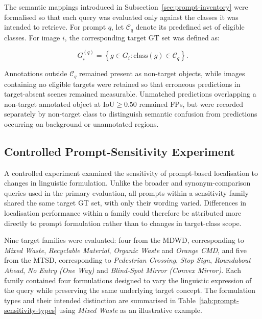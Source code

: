 The semantic mappings introduced in Subsection~\ref{sec:prompt-inventory} were formalised so that each query was evaluated only against the classes it was intended to retrieve. For prompt \(q\), let \(\mathcal{C}_q\) denote its predefined set of eligible classes. For image \(i\), the corresponding target \gls{GT} set was defined as:

\begin{equation}
G_i^{(q)} =
\left\{
g \in G_i :
\mathrm{class}(g) \in \mathcal{C}_q
\right\}.
\end{equation}

\noindent Annotations outside \(\mathcal{C}_q\) remained present as non-target objects, while images containing no eligible targets were retained so that erroneous predictions in target-absent scenes remained measurable. Unmatched predictions overlapping a non-target annotated object at \(\mathrm{IoU} \geq 0.50\) remained \glspl{FP}, but were recorded separately by non-target class to distinguish semantic confusion from predictions occurring on background or unannotated regions.

\subsection{Controlled Prompt-Sensitivity Experiment}
\label{sec:prompt-sensitivity}
A controlled experiment examined the sensitivity of prompt-based localisation to changes in linguistic formulation. Unlike the broader and synonym-comparison queries used in the primary evaluation, all prompts within a sensitivity family shared the same target \gls{GT} set, with only their wording varied. Differences in localisation performance within a family could therefore be attributed more directly to prompt formulation rather than to changes in target-class scope.

Nine target families were evaluated: four from the \gls{MDWD}, corresponding to \emph{Mixed Waste}, \emph{Recyclable Material}, \emph{Organic Waste} and \emph{Orange \gls{CMD}}, and five from the \gls{MTSD}, corresponding to \emph{Pedestrian Crossing}, \emph{Stop Sign}, \emph{Roundabout Ahead}, \emph{No Entry (One Way)} and \emph{Blind-Spot Mirror (Convex Mirror)}. Each family contained four formulations designed to vary the linguistic expression of the query while preserving the same underlying target concept. The formulation types and their intended distinction are summarised in Table~\ref{tab:prompt-sensitivity-types} using \emph{Mixed Waste} as an illustrative example.

